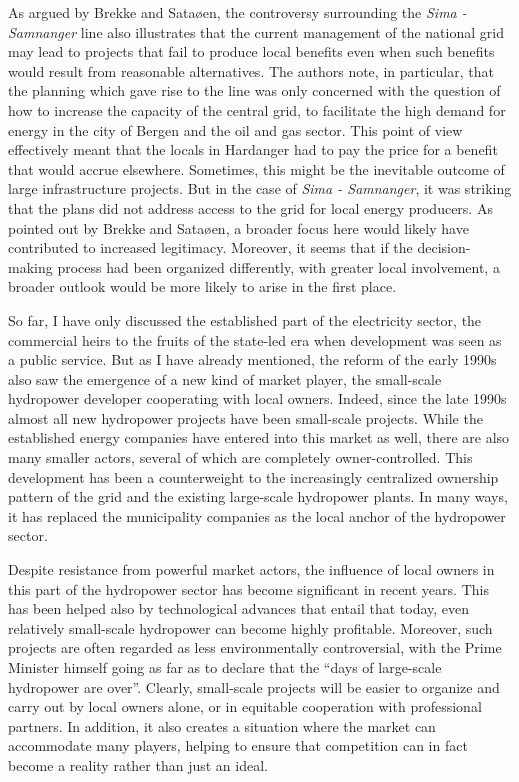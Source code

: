 As argued by Brekke and Sataøen, the controversy surrounding the {\it Sima - Samnanger} line also illustrates that the current management of the national grid may lead to projects that fail to produce local benefits even when such benefits would result from  reasonable alternatives. The authors note, in particular, that the planning which gave rise to the line was only concerned with the question of how to increase the capacity of the central grid, to facilitate the high demand for energy in the city of Bergen and the oil and gas sector. This point of view effectively meant that the locals in Hardanger had to pay the price for a benefit that would accrue elsewhere. Sometimes, this might be the inevitable outcome of large infrastructure projects. But in the case of {\it Sima - Samnanger}, it was striking that the plans did not address access to the grid for local energy producers. As pointed out by Brekke and Sataøen, a broader focus here would likely have contributed to increased legitimacy. Moreover, it seems that if the decision-making process had been organized differently, with greater local involvement, a broader outlook would be more likely to arise in the first place.

So far, I have only discussed the established part of the electricity sector, the commercial heirs to the fruits of the state-led era when development was seen as a public service. But as I have already mentioned, the reform of the early 1990s also saw the emergence of a new kind of market player, the small-scale hydropower developer cooperating with local owners. Indeed, since the late 1990s almost all new hydropower projects have been small-scale projects. While the established energy companies have entered into this market as well, there are also many smaller actors, several of which are completely owner-controlled. This development has been a counterweight to the increasingly centralized ownership pattern of the grid and the existing large-scale hydropower plants. In many ways, it has replaced the municipality companies as the local anchor of the hydropower sector. 

Despite resistance from powerful market actors, the influence of local owners in this part of the hydropower sector has become significant in recent years. This has been helped also by technological advances that entail that today, even relatively  small-scale hydropower can become highly profitable. Moreover, such projects are often regarded as less environmentally controversial, with the Prime Minister himself going as far as to declare that the ``days of large-scale hydropower are over''.  Clearly, small-scale projects will be easier to organize and carry out by local owners alone, or in equitable cooperation with professional partners. In addition, it   also creates a situation where the market can accommodate many players, helping to ensure that competition can in fact become a reality rather than just an ideal.

